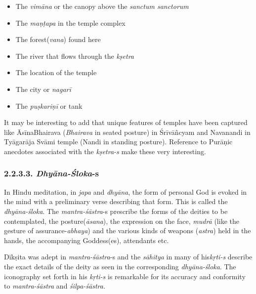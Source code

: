 \begin{itemize}
\itemsep=0pt

 \item The \textit{vimāna} or the canopy above the \textit{sanctum sanctorum}

 \item The \textit{maṇṭapa} in the temple complex

 \item The forest(\textit{vana}) found here

 \item The river that flows through the \textit{kṣetra}

 \item The location of the temple

 \item The city or \textit{nagarī}

 \item The \textit{puṣkariṇī} or tank

\end{itemize}

It may be interesting to add that unique features of temples have been captured like ĀsīnaBhairava (\textit{Bhairava} in seated posture) in Śrīvāñcyam and Navanandi in Tyāgarāja Svāmi temple (Nandi in standing posture). Reference to Purāṇic anecdotes associated with the \textit{kṣetra-s} make these very interesting.

\subsubsection*{2.2.3.3. \textit{Dhyāna-Śloka}-s}

In Hindu meditation, in \textit{japa} and \textit{dhyāna}, the form of personal God is evoked in the mind with a preliminary verse describing that form. This is called the \textit{dhyāna-śloka}. The \textit{mantra-śāstra}-s prescribe the forms of the deities to be contemplated, the posture(\textit{āsana}), the expression on the face, \textit{mudrā} (like the gesture of assurance-\textit{abhaya}) and the various kinds of weapons (\textit{astra}) held in the hands, the accompanying Goddess(es), attendants etc.

Dīkṣita was adept in \textit{mantra-śāstra}-s and the \textit{sāhitya} in many of his\break \textit{kṛti-s} describe the exact details of the deity as seen in the corresponding \textit{dhyāna-śloka}. The iconography set forth in his \textit{kṛti-s} is remarkable for its accuracy and conformity to \textit{mantra-śāstra} and \textit{śilpa-śāstra.}

